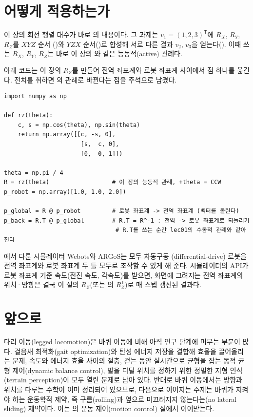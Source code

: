 \section{어떻게 적용하는가}
\label{sec:lec02-apply}

이 장의 회전 행렬 대수가 바로 의 내용이다. 그 과제는
$v_1 = (1, 2, 3)^{\mathsf{T}}$에 $R_X$, $R_Y$, $R_Z$를 $XYZ$ 순서
()와 $YZX$ 순서()로 합성해 서로 다른 결과
$v_2$, $v_3$을 얻는다(). 이때 쓰는 $R_X$, $R_Y$, $R_Z$는
바로 이 장의 와 같은 능동적(active) 관례다.

아래 코드는 이 장의 $R_Z$를 만들어 전역 좌표계와 로봇 좌표계 사이에서 점 하나를
옮긴다. 전치를 취하면 의 관례로 바뀐다는 점을 주석으로 남겼다.

\begin{lstlisting}[style=py,caption={$R_Z$로 점을 전역/로봇 좌표계 사이에서 옮기기.}]
import numpy as np

def rz(theta):
    c, s = np.cos(theta), np.sin(theta)
    return np.array([[c, -s, 0],
                      [s,  c, 0],
                      [0,  0, 1]])

theta = np.pi / 4
R = rz(theta)                  # 이 장의 능동적 관례, +theta = CCW
p_robot = np.array([1.0, 1.0, 2.0])

p_global = R @ p_robot         # 로봇 좌표계 -> 전역 좌표계 (벡터를 돌린다)
p_back = R.T @ p_global        # R.T = R^-1 : 전역 -> 로봇 좌표계로 되돌리기
                                # R.T를 쓰는 순간 lec01의 수동적 관례와 같아진다
\end{lstlisting}

에서 다룬 시뮬레이터 Webots와 ARGoS는 모두 차동구동
(differential-drive) 로봇을 전역 좌표계와 로봇 좌표계 두 틀 모두로 조작할 수
있게 해 준다. 시뮬레이터의 API가 로봇 좌표계 기준 속도(전진 속도, 각속도)를
받으면, 화면에 그려지는 전역 좌표계의 위치·방향은 결국 이 절의 $R_Z$(또는
의 $R^{\mathsf{T}}_Z$)로 매 스텝 갱신된 결과다.

\section{앞으로}
\label{sec:lec02-future}

다리 이동(legged locomotion)은 바퀴 이동에 비해 아직 연구 단계에 머무는
부분이 많다. 걸음새 최적화(gait optimization)와 탄성 에너지 저장을 결합해
효율을 끌어올리는 문제, 속도와 에너지 효율 사이의 절충, 걷는 동안 실시간으로
균형을 잡는 동적 균형 제어(dynamic balance control), 발을 디딜 위치를 정하기
위한 정밀한 지형 인식(terrain perception)이 모두 열린 문제로 남아 있다. 반대로
바퀴 이동에서는 방향과 위치를 다루는 수학이 이미 정리되어 있으므로, 다음으로
이어지는 주제는 바퀴가 지켜야 하는 운동학적 제약, 즉 구름(rolling)과 옆으로
미끄러지지 않는다는(no lateral sliding) 제약이다. 이는 의
운동 제어(motion control) 절에서 이어받는다.

